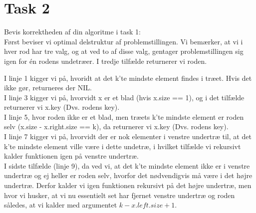 \section{Task 2}

Bevis korrektheden af din algoritme i task 1:\\

Først beviser vi optimal delstruktur af problemstillingen.
Vi bemærker, at vi i hver rod har tre valg, og at ved to af disse valg, gentager problemstillingen sig igen for én rodens undetræer.
I tredje tilfælde returnerer vi roden.

I linje 1 kigger vi på, hvoridt at det k'te mindste element findes i træet. Hvis det ikke gør, returneres der NIL.\\
I linje 3 kigger vi på, hvorvidt x er et blad (hvis x.size == 1), og i det tilfælde returnerer vi x.key (Dvs. rodens key).\\
I linje 5, hvor roden ikke er et blad, men træets k'te mindste element er roden selv (x.size - x.right.size == k), da returnerer vi x.key (Dvs. rodens key).\\ 
I linje 7 kigger vi på, hvorvidt der er nok elementer i venstre undertræ til, at det k'te mindste element ville være i dette undetræ, i hvilket tilfælde vi rekursivt kalder funktionen igen på venstre undertræ.\\
I sidste tilfælde (linje 9), da ved vi, at det k'te mindste element ikke er i venstre undertræ og ej heller er roden selv, hvorfor det nødvendigvis må være i det højre undertræ. Derfor kalder vi igen funktionen rekursivt på det højre undertræ, men hvor vi husker, at vi nu essentielt set har fjernet venstre undertræ og roden således, at vi kalder med argumentet $k-x.left.size + 1$.

